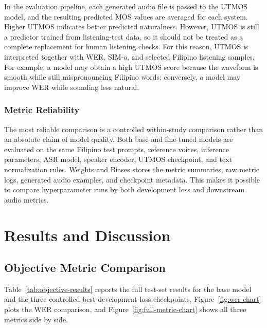 \documentclass[11pt]{article}
\begin{document}
In the evaluation pipeline, each generated audio file is passed to the UTMOS model, and the resulting predicted MOS values are averaged for each system. Higher UTMOS indicates better predicted naturalness. However, UTMOS is still a predictor trained from listening-test data, so it should not be treated as a complete replacement for human listening checks. For this reason, UTMOS is interpreted together with WER, SIM-o, and selected Filipino listening samples. For example, a model may obtain a high UTMOS score because the waveform is smooth while still mispronouncing Filipino words; conversely, a model may improve WER while sounding less natural.

\subsubsection{Metric Reliability}

The most reliable comparison is a controlled within-study comparison rather than an absolute claim of model quality. Both base and fine-tuned models are evaluated on the same Filipino test prompts, reference voices, inference parameters, ASR model, speaker encoder, UTMOS checkpoint, and text normalization rules. Weights and Biases stores the metric summaries, raw metric logs, generated audio examples, and checkpoint metadata. This makes it possible to compare hyperparameter runs by both development loss and downstream audio metrics.

\section{Results and Discussion}
\label{sec:results}

\subsection{Objective Metric Comparison}

Table~\ref{tab:objective-results} reports the full test-set results for the base model and the three controlled best-development-loss checkpoints, Figure~\ref{fig:wer-chart} plots the WER comparison, and Figure~\ref{fig:full-metric-chart} shows all three metrics side by side.
\end{document}
